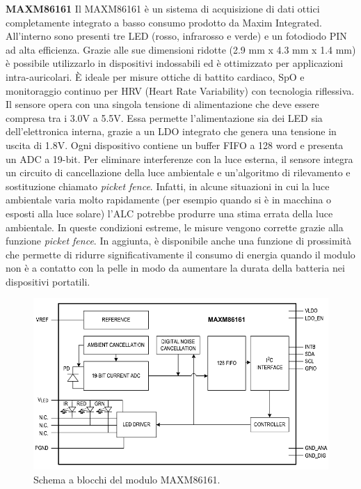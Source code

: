 \textbf{MAXM86161} Il MAXM86161 è un sistema di acquisizione di dati ottici completamente integrato a basso consumo prodotto da Maxim Integrated\cite{IntegratedMAXM86161}. All'interno sono presenti tre LED (rosso, infrarosso e verde) e un fotodiodo PIN ad alta efficienza. Grazie alle sue dimensioni ridotte (2.9 mm x 4.3 mm x 1.4 mm) è possibile utilizzarlo in dispositivi indossabili ed è ottimizzato per applicazioni intra-auricolari. \`E ideale per misure ottiche di battito cardiaco, SpO e monitoraggio continuo per HRV (Heart Rate Variability) con tecnologia riflessiva. Il sensore opera con una singola tensione di alimentazione che deve essere compresa tra i 3.0V a 5.5V. Essa permette l'alimentazione sia dei LED sia dell'elettronica interna, grazie a un LDO integrato che genera una tensione in uscita di 1.8V. Ogni dispositivo contiene un buffer FIFO a 128 word e presenta un ADC a 19-bit. Per eliminare interferenze con la luce esterna, il sensore integra un circuito di cancellazione della luce ambientale e un'algoritmo di rilevamento e sostituzione chiamato \textit{picket fence}. Infatti, in alcune situazioni in cui la luce ambientale varia molto rapidamente (per esempio quando si è in macchina o esposti alla luce solare) l'ALC potrebbe produrre una stima errata della luce ambientale. In queste condizioni estreme, le misure vengono corrette grazie alla funzione \textit{picket fence}. In aggiunta, è disponibile anche una funzione di prossimità che permette di ridurre significativamente il consumo di energia quando il modulo non è a contatto con la pelle in modo da aumentare la durata della batteria nei dispositivi portatili. 
\begin{figure}[h]
	\centering
	\includegraphics[width=0.7\linewidth]{ImageFiles/Fotopletismografia/MAXM86161BlockDiagram}
	\caption{Schema a blocchi del modulo MAXM86161.}
	\label{fig:MAXM86161BlockDiagram}
\end{figure}

